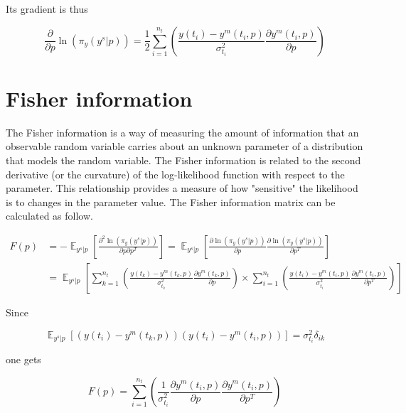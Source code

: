 \documentclass[]{scrartcl}
\begin{document}
Its gradient is thus

\begin{equation}
	\frac{\partial}{\partial p} \ln (\pi_y (y^s|p)) =  \frac{1}{2} \sum_{i=1}^{n_t}  \left( \frac{y(t_i) - y^m(t_i, p)}{\sigma_{t_i}^2} \frac{\partial y^m(t_i, p)}{\partial p} \right)
\end{equation}

\section{Fisher information}

The Fisher information is a way of measuring the amount of information that an observable random variable carries about an unknown parameter of a distribution that models the random variable. The Fisher information is related to the second derivative (or the curvature) of the log-likelihood function with respect to the parameter. This relationship provides a measure of how "sensitive" the likelihood is to changes in the parameter value. The Fisher information matrix can be calculated as follow.

\begin{align}
	F(p) &= - \mathop{\mathbb{E}}_{y^s|p} \left[ \frac{\partial^2 \ln (\pi_y (y^s|p))}{\partial p \partial p^T} \right] = \mathop{\mathbb{E}}_{y^s|p} \left[ \frac{\partial \ln (\pi_y (y^s|p))}{\partial p} \frac{\partial \ln (\pi_y (y^s|p))}{\partial p^T} \right] \\
	&= \mathop{\mathbb{E}}_{y^s|p} \left[ \sum_{k=1}^{n_t} \left( \frac{y(t_k) - y^m(t_k, p)}{\sigma_{t_k}^2} \frac{\partial y^m(t_k, p)}{\partial p} \right) \times  \sum_{i=1}^{n_t} \left( \frac{y(t_i) - y^m(t_i, p)}{\sigma_{t_i}^2} \frac{\partial y^m(t_i, p)}{\partial p^T} \right) \right]
\end{align}

Since

\begin{equation}
	\mathop{\mathbb{E}}_{y^s|p} \left[ \left( y(t_i) - y^m(t_k, p) \right) \left( y(t_i) - y^m(t_i, p) \right) \right] = \sigma_{t_i}^2 \delta_{ik}
\end{equation}

one gets

\begin{equation}
	F(p) = \sum_{i=1}^{n_t} \left( \frac{1}{\sigma_{t_i}^2} \frac{\partial y^m(t_i, p)}{\partial p} \frac{\partial y^m(t_i, p)}{\partial p^T} \right)
\end{equation}
\end{document}

